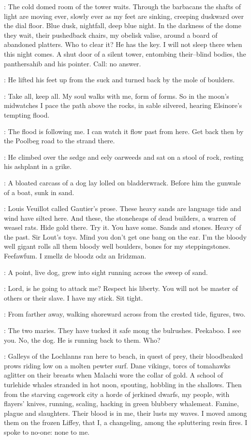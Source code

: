 \StephenInt:
The cold domed room of the tower waits.
Through the barbacans
the shafts of light are moving ever,
slowly ever as my feet are sinking,
creeping duskward over the dial floor.
Blue dusk, nightfall, deep blue night.
In the darkness of the dome
they wait, their pushedback chairs,
my obelisk valise,
around a board of abandoned platters.
Who to clear it?
He has the key.
I will not sleep there when this night comes.
A shut door of a silent tower,
entombing their--blind bodies,
the panthersahib and his pointer.
Call:
no answer.

:
He lifted his feet up from the suck
and turned back by the mole of boulders.

\StephenInt:
Take all, keep all.
My soul walks with me, form of forms.
So in the moon's midwatches
I pace the path above the rocks,
in sable silvered, hearing Elsinore's tempting flood.

\StephenInt:
The flood is following me.
I can watch it flow past from here.
Get back then by the Poolbeg road to the strand there.

:
He climbed over the sedge and eely oarweeds
and sat on a stool of rock, resting his ashplant in a grike.

:
A bloated carcass of a dog lay lolled on bladderwrack.
Before him the gunwale of a boat, sunk in sand.

\StephenInt:
 Louis Veuillot called Gautier's prose.
These heavy sands are language tide and wind have silted here.
And these, the stoneheaps of dead builders, a warren of weasel rats.
Hide gold there.
Try it.
You have some.
Sands and stones.
Heavy of the past.
Sir Lout's toys.
Mind you don't get one bang on the ear.
I'm the bloody well gigant
rolls all them bloody well boulders,
bones for my steppingstones.
Feefawfum.
I zmellz de bloodz odz an Iridzman.

:
A point, live dog,
grew into sight running across the sweep of sand.

\StephenInt:
Lord, is he going to attack me?
Respect his liberty.
You will not be master of others or their slave.
I have my stick.
Sit tight.

:
From farther away,
walking shoreward across from the crested tide,
figures, two.

\StephenInt:
The two maries.
They have tucked it safe mong the bulrushes.
Peekaboo.
I see you.
No, the dog.
He is running back to them.
Who?

\StephenInt:
Galleys of the Lochlanns ran here to beach,
in quest of prey,
their bloodbeaked prows riding low on a molten pewter surf.
Dane vikings,
torcs of tomahawks aglitter on their breasts
when Malachi wore the collar of gold.
A school of turlehide whales stranded in hot noon, spouting,
hobbling in the shallows.
Then from the starving cagework city
a horde of jerkined dwarfs,
my people, with flayers' knives,
running, scaling, hacking in green blubbery whalemeat.
Famine, plague and slaughters.
Their blood is in me, their lusts my waves.
I moved among them on the frozen Liffey,
that I, a changeling, among the spluttering resin fires.
I spoke to no-one:
none to me.


